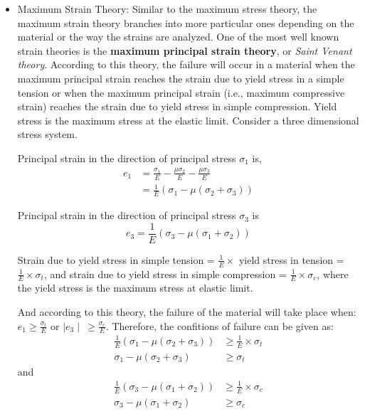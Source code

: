 \documentclass[letterpaper]{article}
\begin{document}
\begin{multicols}{2}
\begin{itemize}
		\item Maximum Strain Theory: Similar to the maximum stress theory, the maximum strain theory branches into more particular ones depending on the material or the way the strains are analyzed. One of the most well known strain theories is the \textbf{maximum principal strain theory}, or \textit{Saint Venant theory}. According to this theory, the failure will occur in a material when the maximum principal strain reaches the strain due to yield stress in a simple tension or when the maximum principal strain (i.e., maximum compressive strain) reaches the strain due to yield stress in simple compression. Yield stress is the maximum stress at the elastic limit. Consider a three dimensional stress system.\supercite{bansal09}

			Principal strain in the direction of principal stress $\sigma_1$ is,
			\begin{equation}
				\begin{split}
				e_1 &= \frac{\sigma_1}{E} - \frac{\mu \sigma_2}{E} - \frac{\mu \sigma_3}{E} \\
					&= \frac{1}{E} (\sigma_1 - \mu (\sigma_2 + \sigma_3))
				\end{split}
			\end{equation}

			Principal strain in the direction of principal stress $\sigma_3$ is
			\begin{equation}
				e_3 = \frac{1}{E} (\sigma_3 - \mu (\sigma_1 + \sigma_2))
			\end{equation}

			Strain due to yield stress in simple tension = $\frac{1}{E} \times$ yield stress in tension = $\frac{1}{E} \times \sigma_t$, and strain due to yield stress in simple compression = $\frac{1}{E} \times \sigma_c$, where the yield stress is the maximum stress at elastic limit. 
			
			And according to this theory, the failure of the material will take place when:
			$e_1 \geq \frac{\sigma_t}{E}$ or $\mid e_3 \mid \ \geq \frac{\sigma_c}{E}$.
			Therefore, the confitions of failure can be given as:
			\begin{equation}
				\begin{split}
					\frac{1}{E} (\sigma_1 - \mu (\sigma_2 + \sigma_3)) &\geq \frac{1}{E} \times \sigma_t \\
					\sigma _1 - \mu (\sigma_2 + \sigma_3) &\geq \sigma_t
				\end{split}
			\end{equation}
			and
			\begin{equation}
				\begin{split}
					\frac{1}{E} (\sigma_3 - \mu (\sigma_1 + \sigma_2)) &\geq \frac{1}{E} \times \sigma_c \\
					\sigma_3 - \mu (\sigma_1 + \sigma_2) &\geq \sigma_c
				\end{split}
			\end{equation}
	\end{itemize}
	

\end{multicols}
\end{document}
